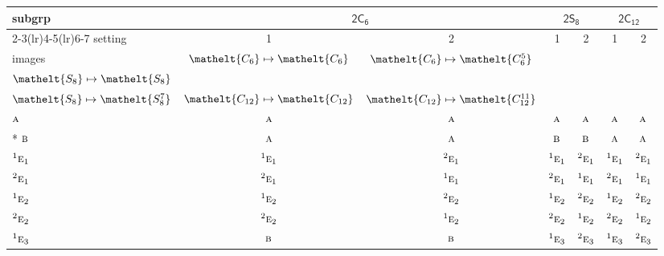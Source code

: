 \documentclass[10pt,a4paper]{article}
\numberwithin{equation}{section}
\newcommand{\eltfont}[1]{{\let\sigma\eltsigma\mathelt{#1}}}
\newcommand{\grp}[1]{\mathsf{#1}}
\newcommand{\irr}[1]{\text{\normalfont\scshape #1}}
\newcommand{\conjpair}[1]{{}^{#1}}
\newcommand{\cls}[1]{\eltfont{#1}}
\begin{document}
{\small\begin{longtable}{@{}lcccccc@{}}\toprule
subgrp & \multicolumn{2}{c}{\href{2C6.pdf}{$\grp{2C_{6}}$}} & \multicolumn{2}{c}{\href{2S8.pdf}{$\grp{2S_{8}}$}} & \multicolumn{2}{c}{\href{2C12.pdf}{$\grp{2C_{12}}$}}\\\cmidrule(lr){2-3}\cmidrule(lr){4-5}\cmidrule(lr){6-7}
setting & 1 & 2 & 1 & 2 & 1 & 2\\
images & {\scriptsize $\cls{C_{6}} \mapsto \cls{C_{6}}$} & {\scriptsize $\cls{C_{6}} \mapsto \cls{C_{6}^{5}}$} & {\scriptsize\begin{tabular}[t]{@{}c@{}}$\cls{C_{4}} \mapsto \cls{C_{4}}$\\$\cls{S_{8}} \mapsto \cls{S_{8}}$\end{tabular}} & {\scriptsize\begin{tabular}[t]{@{}c@{}}$\cls{C_{4}} \mapsto \cls{C_{4}^{3}}$\\$\cls{S_{8}} \mapsto \cls{S_{8}^{7}}$\end{tabular}} & {\scriptsize $\cls{C_{12}} \mapsto \cls{C_{12}}$} & {\scriptsize $\cls{C_{12}} \mapsto \cls{C_{12}^{11}}$}\\\midrule\endhead
\bottomrule\endfoot\endlastfoot
$\irr{a}$ & $\irr{a}$ & $\irr{a}$ & $\irr{a}$ & $\irr{a}$ & $\irr{a}$ & $\irr{a}$\\*
$\irr{b}$ & $\irr{a}$ & $\irr{a}$ & $\irr{b}$ & $\irr{b}$ & $\irr{a}$ & $\irr{a}$\\
$\conjpair{1}\irr{e}_{1}$ & $\conjpair{1}\irr{e}_{1}$ & $\conjpair{2}\irr{e}_{1}$ & $\conjpair{1}\irr{e}_{1}$ & $\conjpair{2}\irr{e}_{1}$ & $\conjpair{1}\irr{e}_{1}$ & $\conjpair{2}\irr{e}_{1}$\\
$\conjpair{2}\irr{e}_{1}$ & $\conjpair{2}\irr{e}_{1}$ & $\conjpair{1}\irr{e}_{1}$ & $\conjpair{2}\irr{e}_{1}$ & $\conjpair{1}\irr{e}_{1}$ & $\conjpair{2}\irr{e}_{1}$ & $\conjpair{1}\irr{e}_{1}$\\
$\conjpair{1}\irr{e}_{2}$ & $\conjpair{1}\irr{e}_{2}$ & $\conjpair{2}\irr{e}_{2}$ & $\conjpair{1}\irr{e}_{2}$ & $\conjpair{2}\irr{e}_{2}$ & $\conjpair{1}\irr{e}_{2}$ & $\conjpair{2}\irr{e}_{2}$\\
$\conjpair{2}\irr{e}_{2}$ & $\conjpair{2}\irr{e}_{2}$ & $\conjpair{1}\irr{e}_{2}$ & $\conjpair{2}\irr{e}_{2}$ & $\conjpair{1}\irr{e}_{2}$ & $\conjpair{2}\irr{e}_{2}$ & $\conjpair{1}\irr{e}_{2}$\\
$\conjpair{1}\irr{e}_{3}$ & $\irr{b}$ & $\irr{b}$ & $\conjpair{1}\irr{e}_{3}$ & $\conjpair{2}\irr{e}_{3}$ & $\conjpair{1}\irr{e}_{3}$ & $\conjpair{2}\irr{e}_{3}$\\

\end{longtable}}
\end{document}
